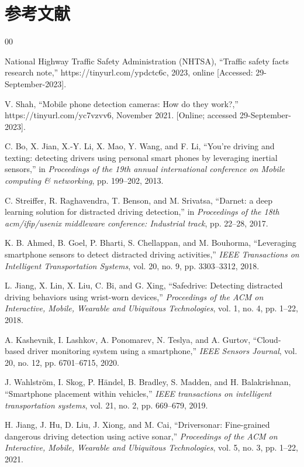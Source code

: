 \documentclass[journal, onecolumn]{IEEEtran}
\begin{document}
\section*{参考文献}

\begin{thebibliography}{00}

 National Highway Traffic Safety Administration (NHTSA), “Traffic safety facts research note,” https://tinyurl.com/ypdctc6c, 2023, online [Accessed: 29-September-2023].

 V. Shah, “Mobile phone detection cameras: How do they work?,” https://tinyurl.com/yc7vzvv6, November 2021. [Online; accessed 29-September-2023].

 C. Bo, X. Jian, X.-Y. Li, X. Mao, Y. Wang, and F. Li, “You’re driving and texting: detecting drivers using personal smart phones by leveraging inertial sensors,” in \emph{Proceedings of the 19th annual international conference on Mobile computing \& networking}, pp. 199–202, 2013.

 C. Streiffer, R. Raghavendra, T. Benson, and M. Srivatsa, “Darnet: a deep learning solution for distracted driving detection,” in \emph{Proceedings of the 18th acm/ifip/usenix middleware conference: Industrial track}, pp. 22–28, 2017.

 K. B. Ahmed, B. Goel, P. Bharti, S. Chellappan, and M. Bouhorma, “Leveraging smartphone sensors to detect distracted driving activities,” \emph{IEEE Transactions on Intelligent Transportation Systems}, vol. 20, no. 9, pp. 3303–3312, 2018.

 L. Jiang, X. Lin, X. Liu, C. Bi, and G. Xing, “Safedrive: Detecting distracted driving behaviors using wrist-worn devices,” \emph{Proceedings of the ACM on Interactive, Mobile, Wearable and Ubiquitous Technologies}, vol. 1, no. 4, pp. 1–22, 2018.

 A. Kashevnik, I. Lashkov, A. Ponomarev, N. Teslya, and A. Gurtov, “Cloud-based driver monitoring system using a smartphone,” \emph{IEEE Sensors Journal}, vol. 20, no. 12, pp. 6701–6715, 2020.

 J. Wahlström, I. Skog, P. Händel, B. Bradley, S. Madden, and H. Balakrishnan, “Smartphone placement within vehicles,” \emph{IEEE transactions on intelligent transportation systems}, vol. 21, no. 2, pp. 669–679, 2019.

 H. Jiang, J. Hu, D. Liu, J. Xiong, and M. Cai, “Driversonar: Fine-grained dangerous driving detection using active sonar,” \emph{Proceedings of the ACM on Interactive, Mobile, Wearable and Ubiquitous Technologies}, vol. 5, no. 3, pp. 1–22, 2021.


\end{thebibliography}
\end{document}
